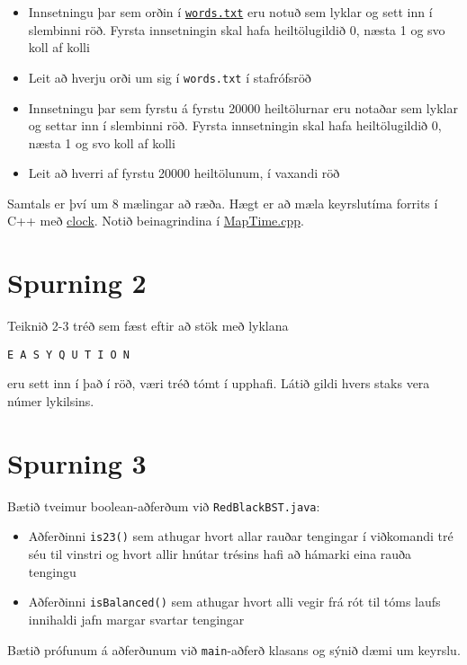 \documentclass{article}
\begin{document}
\begin{itemize}
 \item Innsetningu þar sem orðin í \href{http://introcs.cs.princeton.edu/java/data/words.txt}{\texttt{words.txt}} eru notuð sem lyklar og sett inn í slembinni röð. Fyrsta innsetningin skal hafa heiltölugildið 0, næsta 1 og svo koll af kolli
 \item Leit að hverju orði um sig í \texttt{words.txt} í stafrófsröð
 \item Innsetningu þar sem fyrstu á fyrstu 20000 heiltölurnar eru notaðar sem lyklar og settar inn í slembinni röð. Fyrsta innsetningin skal hafa heiltölugildið 0, næsta 1 og svo koll af kolli
 \item Leit að hverri af fyrstu 20000 heiltölunum, í vaxandi röð
\end{itemize}
Samtals er því um 8 mælingar að ræða. Hægt er að mæla keyrslutíma forrits í C++ með \href{http://www.cplusplus.com/reference/ctime/clock/}{clock}. Notið beinagrindina í \href{https://github.com/Ernir/kennsluefni/tree/master/T2/Code/w9/MapTime.cpp}{MapTime.cpp}.

\newpage

\section{Spurning 2}
Teiknið 2-3 tréð sem fæst eftir að stök með lyklana
\begin{center}
\texttt{E A S Y Q U T I O N} 
\end{center}
eru sett inn í það í röð, væri tréð tómt í upphafi. Látið gildi hvers staks vera númer lykilsins.

\section{Spurning 3}

Bætið tveimur boolean-aðferðum við \texttt{RedBlackBST.java}:

\begin{itemize}
 \item Aðferðinni \texttt{is23()} sem athugar hvort allar rauðar tengingar í viðkomandi tré séu til vinstri og hvort allir hnútar trésins hafi að hámarki eina rauða tengingu
 \item Aðferðinni \texttt{isBalanced()} sem athugar hvort alli vegir frá rót til tóms laufs innihaldi jafn margar svartar tengingar
\end{itemize}

Bætið prófunum á aðferðunum við \texttt{main}-aðferð klasans og sýnið dæmi um keyrslu.
\end{document}
